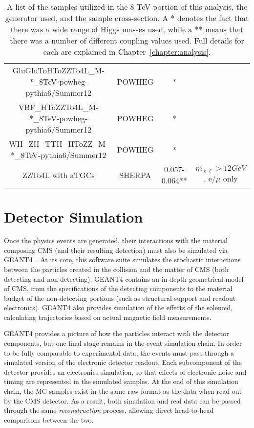 \begin{sidewaystable}
\begin{tabular}{|c|c|c|c|}
GluGluToHToZZTo4L\_M-*\_8TeV-powheg-pythia6/Summer12 & POWHEG & * & \\
VBF\_HToZZTo4L\_M-*\_8TeV-powheg-pythia6/Summer12 & POWHEG & * & \\
WH\_ZH\_TTH\_HToZZ\_M-*\_8TeV-pythia6/Summer12 & POWHEG & * & \\
ZZTo4L with aTGCs & SHERPA & 0.057-0.064** & $m_{\ell\ell} > 12 GeV$, e/$\mu$
only \\

\hline
\end{tabular}
\caption[Summary of Monte Carlo samples used.]{A list of the samples utilized in the 8
TeV portion of this analysis, the generator used, and the sample cross-section.
A * denotes the fact that there was a wide range of Higgs masses used, while a
** means that there was a number of different coupling values used. Full details
for each are explained in Chapter~\ref{chapter:analysis}.}
\label{tab:MC_samples}
\end{sidewaystable}


\section{Detector Simulation}
Once the physics events are generated, their interactions with the material
composing CMS (and their resulting detection) must also be simulated via
GEANT4~\cite{GEANT4}. At its core, this software suite simulates the stochastic
interactions between the particles created in the collision and the matter of
CMS (both detecting and non-detecting). GEANT4 contains an in-depth geometrical
model of CMS, from the specifications of the detecting components to the material
budget of the non-detecting portions (such as structural support and readout
electronics). GEANT4 also provides simulation of the effects of the solenoid,
calculating trajectories based on actual magnetic field measurements. 

GEANT4 provides a picture of how the particles interact with the detector
components, but one final stage remains in the event simulation chain. In order
to be fully comparable to experimental data, the events must pass through a
simulated version of the electronic detector readout. Each subcomponent of the
detector provides an electronics simulation, so that effects of electronic noise
and timing are represented in the simulated samples. At the end of this
simulation chain, the MC samples exist in the same raw format as the data when
read out by the CMS detector. As a result, both simulation and real data can be
passed through the same \emph{reconstruction} process, allowing direct
head-to-head comparisons between the two.
